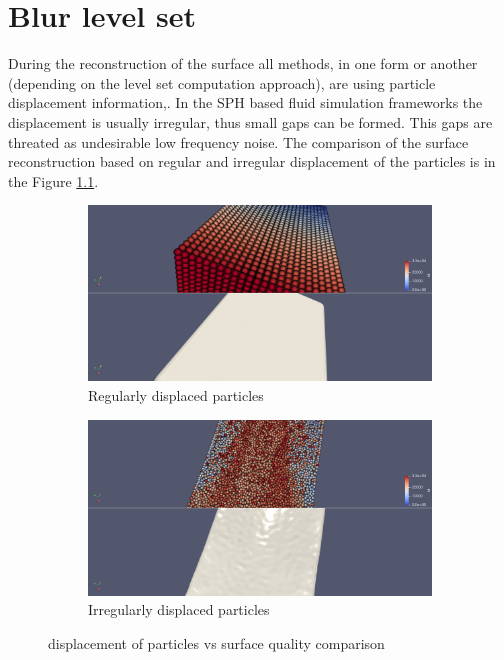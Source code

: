\chapter{Blur level set}
During the reconstruction of the surface all methods, in one form or another (depending on the level set computation approach), are using particle displacement information,. In the SPH based fluid simulation frameworks the displacement is usually irregular, thus small gaps can be formed. This gaps are threated as undesirable low frequency noise. The comparison of the surface reconstruction based on regular and irregular displacement of the particles is in the Figure \ref{fig:rec_vs_displacement}.
\begin{figure}[h]
	\begin{center}
		\begin{subfigure}[b]{0.6\textwidth}
			\includegraphics[width=\textwidth]{figures/FlatSurfaceWsParticleDisplacement.png}
			\caption{Regularly displaced particles}
		\end{subfigure}
		\begin{subfigure}[b]{0.6\textwidth}
			\includegraphics[width=\textwidth]{figures/NonFlatSurfaceWsParticleDisplacement.png}
			\caption{Irregularly displaced particles}
		\end{subfigure}
	\end{center}
	\caption{displacement of particles vs surface quality comparison}
	\label{fig:rec_vs_displacement}
\end{figure}



